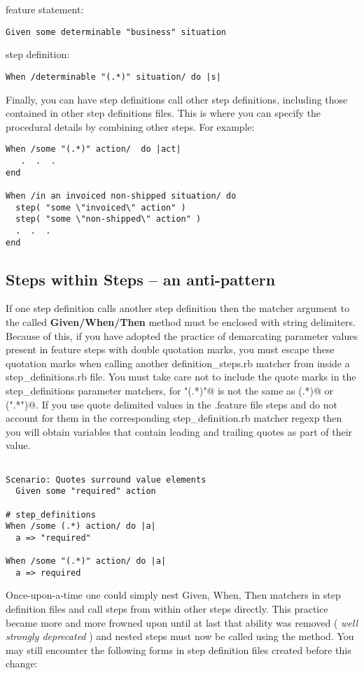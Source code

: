feature statement:
\begin{verbatim}
Given some determinable "business" situation

\end{verbatim}

step definition:
\begin{verbatim}
When /determinable "(.*)" situation/ do |s|

\end{verbatim}

Finally, you can have step definitions call other step definitions, including those contained in other step definitions files.  This is where you can specify the procedural details by combining other steps. For example:

\begin{verbatim}
When /some "(.*)" action/  do |act|
   .  .  .
end

When /in an invoiced non-shipped situation/ do
  step( "some \"invoiced\" action" )
  step( "some \"non-shipped\" action" )
  .  .  .
end

\end{verbatim}
\subsection{Steps within Steps -- an anti-pattern}

If one step definition calls another step definition then the matcher argument to the called \textbf{Given/When/Then} method must be enclosed with string delimiters.  Because of this, if you have adopted the practice of demarcating parameter values present in feature steps with double quotation marks, you must escape these quotation marks when calling another definition\_steps.rb matcher from inside a step\_definitions.rb file.  You must take care not to include the quote marks in the step\_definitions parameter matchers, for \verb@"(.*)"@ is not the same as \verb@(.*)@ or \verb@(".*")@.  If you use quote delimited values in the .feature file steps and do not account for them in the corresponding step\_definition.rb matcher regexp then you will obtain variables that contain leading and trailing quotes as part of their value.

\begin{verbatim}

Scenario: Quotes surround value elements
  Given some "required" action

# step_definitions
When /some (.*) action/ do |a|
  a => "required"

When /some "(.*)" action/ do |a|
  a => required

\end{verbatim}
Once-upon-a-time one could simply nest Given, When, Then matchers in step definition files and call steps from within other steps directly.  This practice became more and more frowned upon until at last that ability was removed ( \emph{well strongly deprecated} ) and nested steps must now be called using the \textbf{\verb@step@} method.  You may still encounter the following forms in step definition files created before this change:

